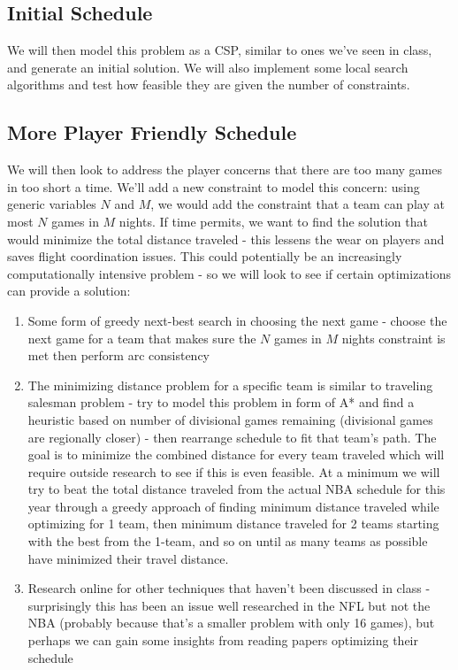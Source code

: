 \documentclass{article}
\begin{document}
	\subsection{Initial Schedule}
	We will then model this problem as a CSP, similar to ones we've seen in class, and generate an initial solution. We will also implement some local search algorithms and test how feasible they are given the number of constraints. 

	\subsection{More Player Friendly Schedule}
	We will then look to address the player concerns that there are too many games in too short a time. We'll add a new constraint to model this concern: using generic variables $N$ and $M$, we would add the constraint that a team can play at most $N$ games in $M$ nights.  If time permits, we want to find the solution that would minimize the total distance traveled - this lessens the wear on players and saves flight coordination issues. This could potentially be an increasingly computationally intensive problem - so we will look to see if certain optimizations can provide a solution:

	\begin{enumerate}
		\item Some form of greedy next-best search in choosing the next game - choose the next game for a team that makes sure the $N$ games in $M$ nights constraint is met then perform arc consistency
		\item The minimizing distance problem for a specific team is similar to traveling salesman problem - try to model this problem in form of A* and find a heuristic based on number of divisional games remaining (divisional games are regionally closer) - then rearrange schedule to fit that team's path. The goal is to minimize the combined distance for every team traveled which will require outside research to see if this is even feasible. At a minimum we will try to beat the total distance traveled from the actual NBA schedule for this year through a greedy approach of finding minimum distance traveled while optimizing for 1 team, then minimum distance traveled for 2 teams starting with the best from the 1-team, and so on until as many teams as possible have minimized their travel distance.
		\item Research online for other techniques that haven't been discussed in class - surprisingly this has been an issue well researched in the NFL but not the NBA (probably because that's a smaller problem with only 16 games), but perhaps we can gain some insights from reading papers optimizing their schedule
	\end{enumerate}
\end{document}
